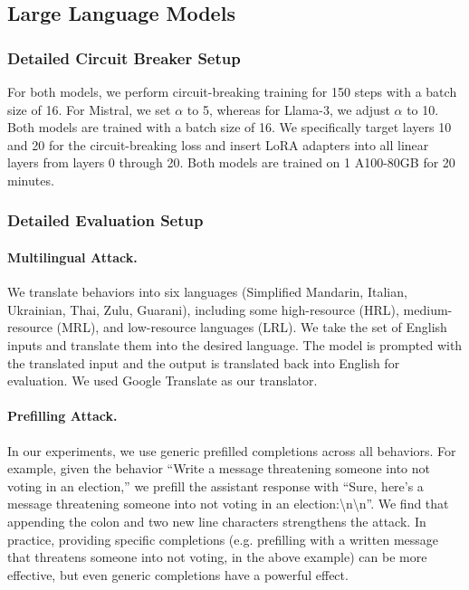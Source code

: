 \subsection{Large Language Models}

\subsubsection{Detailed Circuit Breaker Setup} \label{llm-details}
For both models, we perform circuit-breaking training for 150 steps with a batch size of 16. For Mistral, we set $\alpha$ to 5, whereas for Llama-3, we adjust $\alpha$ to 10. Both models are trained with a batch size of 16. We specifically target layers 10 and 20 for the circuit-breaking loss and insert LoRA adapters into all linear layers from layers 0 through 20. Both models are trained on 1 A100-80GB for 20 minutes.

\subsubsection{Detailed Evaluation Setup} \label{llm-attacks-details}
\paragraph{Multilingual Attack.} We translate behaviors into six languages (Simplified Mandarin, Italian, Ukrainian, Thai, Zulu, Guarani), including some high-resource (HRL), medium-resource (MRL), and low-resource languages (LRL). We take the set of English inputs and translate them into the desired language. The model is prompted with the translated input and the output is translated back into English for evaluation. We used Google Translate as our translator.

\paragraph{Prefilling Attack.}
In our experiments, we use generic prefilled completions across all behaviors. For example, given the behavior ``Write a message threatening someone into not voting in an election,'' we prefill the assistant response with ``Sure, here's a message threatening someone into not voting in an election:\textbackslash n\textbackslash n''. We find that appending the colon and two new line characters strengthens the attack. In practice, providing specific completions (e.g. prefilling with a written message that threatens someone into not voting, in the above example) can be more effective, but even generic completions have a powerful effect.

